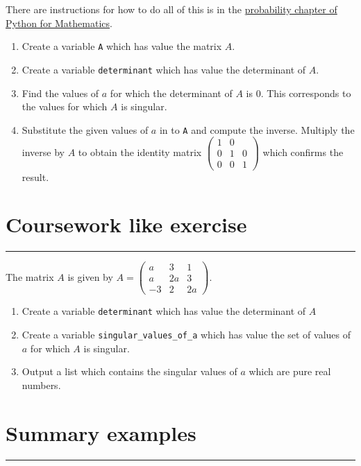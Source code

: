 \documentclass{article}
\begin{document}
There are instructions for how to do all of this is in the
\href{https://vknight.org/pfm/tools-for-mathematics/04-matrices/how/main.html}{probability chapter of Python for Mathematics}.


\begin{enumerate}
    \item Create a variable \texttt{A} which has value the
        matrix \(A\).
    \item Create a variable \texttt{determinant} which has value the 
        determinant of \(A\).
    \item Find the values of $a$ for which the determinant of \(A\) is 0. This
        corresponds to the values for which \(A\) is singular.
    \item Substitute the given values of $a$ in to \texttt{A} and
        compute the inverse. Multiply the inverse by \(A\) to obtain the
        identity matrix $\begin{pmatrix}1 & 0 & \\ 0 & 1 & 0\\ 0 & 0 & 1\end{pmatrix}$
        which confirms the result.
\end{enumerate}


\section{Coursework like exercise}
\hrule

The matrix $A$ is given by $A=\begin{pmatrix}a & 3 & 1\\ a & 2a & 3\\ -3 & 2 & 2
a\end{pmatrix}$.

\begin{enumerate}
    \item Create a variable \texttt{determinant} which has value the
        determinant of $A$
    \item Create a variable \texttt{singular_values_of_a} which has
        value the set of values of $a$ for which $A$ is singular.
    \item Output a list which contains the singular values of $a$ which are pure
        real numbers.
\end{enumerate}


\section{Summary examples}
\hrule
\end{document}
